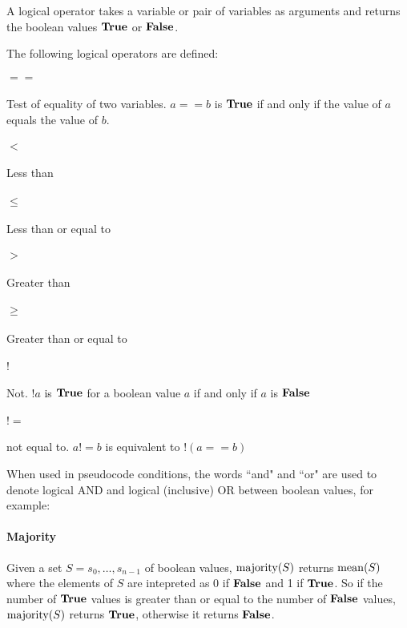 A logical operator takes a variable or pair of variables as arguments and
returns the boolean values $\text{\bf{True}}$ or $\text{\bf{False}}$.

The following logical operators are defined:

\paragraph*{$==$} Test of equality of two variables. $a==b$ is $\text{\bf{True}}$ if and
only if the value of $a$ equals the value of $b$. 

\paragraph*{$<$}	Less than

\paragraph*{$\leq$} Less than or equal to

\paragraph*{$>$}	Greater than

\paragraph*{$\geq$} Greater than or equal to

\paragraph*{$!$} Not. $!a$ is $\text{\bf{True}}$ for a boolean value $a$ if and only if $a$ is $\text{\bf{False}}$

\paragraph*{$!=$} not equal to. $a!=b$ is equivalent to $!(a==b)$

When used in pseudocode conditions, the words ``and" and ``or" are used to denote logical AND
and logical (inclusive) OR between boolean values, for example:

\begin{pseudo*}
    \bsCODE{\hdots}
\bsEND
\end{pseudo*}

\paragraph*{Majority} Given a set $S=s_0, \hdots, s_{n-1}$ of boolean values, $\operatorname{majority}(S)$ 
returns $\operatorname{mean}(S)$ where the elements of $S$ are intepreted as $0$ if $\text{\bf{False}}$ and 1 if $\text{\bf{True}}$.
So if the number of $\text{\bf{True}}$ values is greater than or equal to the number of $\text{\bf{False}}$ values, $\operatorname{majority}(S)$ returns
$\text{\bf{True}}$, otherwise it returns $\text{\bf{False}}$.
